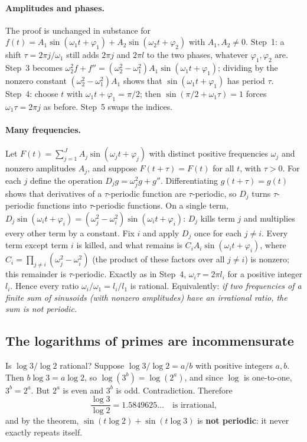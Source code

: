 \paragraph{Amplitudes and phases.} The proof is unchanged in substance for $f(t)=A_1\sin(\omega_1t+\varphi_1)+A_2\sin(\omega_2t+\varphi_2)$ with $A_1,A_2\neq0$. Step~1: a shift $\tau=2\pi j/\omega_1$ still adds $2\pi j$ and $2\pi l$ to the two phases, whatever $\varphi_1,\varphi_2$ are. Step~3 becomes $\omega_2^2f+f''=(\omega_2^2-\omega_1^2)A_1\sin(\omega_1t+\varphi_1)$; dividing by the nonzero constant $(\omega_2^2-\omega_1^2)A_1$ shows that $\sin(\omega_1t+\varphi_1)$ has period $\tau$. Step~4: choose $t$ with $\omega_1t+\varphi_1=\pi/2$; then $\sin(\pi/2+\omega_1\tau)=1$ forces $\omega_1\tau=2\pi j$ as before. Step~5 swaps the indices.

\paragraph{Many frequencies.} Let $F(t)=\sum_{j=1}^{J}A_j\sin(\omega_jt+\varphi_j)$ with distinct positive frequencies $\omega_j$ and nonzero amplitudes $A_j$, and suppose $F(t+\tau)=F(t)$ for all $t$, with $\tau>0$. For each $j$ define the operation $D_jg=\omega_j^2g+g''$. Differentiating $g(t+\tau)=g(t)$ shows that derivatives of a $\tau$-periodic function are $\tau$-periodic, so $D_j$ turns $\tau$-periodic functions into $\tau$-periodic functions. On a single term, $D_j\sin(\omega_it+\varphi_i)=(\omega_j^2-\omega_i^2)\sin(\omega_it+\varphi_i)$: $D_j$ kills term $j$ and multiplies every other term by a constant. Fix $i$ and apply $D_j$ once for each $j\neq i$. Every term except term $i$ is killed, and what remains is $C_iA_i\sin(\omega_it+\varphi_i)$, where $C_i=\prod_{j\neq i}(\omega_j^2-\omega_i^2)$ (the product of these factors over all $j\neq i$) is nonzero; this remainder is $\tau$-periodic. Exactly as in Step~4, $\omega_i\tau=2\pi l_i$ for a positive integer $l_i$. Hence every ratio $\omega_i/\omega_1=l_i/l_1$ is rational. Equivalently: \emph{if two frequencies of a finite sum of sinusoids (with nonzero amplitudes) have an irrational ratio, the sum is not periodic.}

\subsection{The logarithms of primes are incommensurate}

Is $\log3/\log2$ rational? Suppose $\log3/\log2=a/b$ with positive integers $a,b$. Then $b\log3=a\log2$, so $\log(3^b)=\log(2^a)$, and since $\log$ is one-to-one, $3^b=2^a$. But $2^a$ is even and $3^b$ is odd. Contradiction. Therefore
\begin{equation}
\frac{\log3}{\log2}=1.5849625\ldots\quad\text{is irrational},
\end{equation}
and by the theorem, $\sin(t\log2)+\sin(t\log3)$ is \textbf{not periodic}: it never exactly repeats itself.

